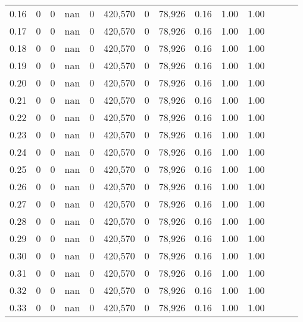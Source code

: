 \begin{tabular}{rrrrrrrrrrrrrr}
0.16 &        0 &       0 &   nan &        0 &  420,570 &       0 &  78,926 &  0.16 &  1.00 &      1.00 \\
0.17 &        0 &       0 &   nan &        0 &  420,570 &       0 &  78,926 &  0.16 &  1.00 &      1.00 \\
0.18 &        0 &       0 &   nan &        0 &  420,570 &       0 &  78,926 &  0.16 &  1.00 &      1.00 \\
0.19 &        0 &       0 &   nan &        0 &  420,570 &       0 &  78,926 &  0.16 &  1.00 &      1.00 \\
0.20 &        0 &       0 &   nan &        0 &  420,570 &       0 &  78,926 &  0.16 &  1.00 &      1.00 \\
0.21 &        0 &       0 &   nan &        0 &  420,570 &       0 &  78,926 &  0.16 &  1.00 &      1.00 \\
0.22 &        0 &       0 &   nan &        0 &  420,570 &       0 &  78,926 &  0.16 &  1.00 &      1.00 \\
0.23 &        0 &       0 &   nan &        0 &  420,570 &       0 &  78,926 &  0.16 &  1.00 &      1.00 \\
0.24 &        0 &       0 &   nan &        0 &  420,570 &       0 &  78,926 &  0.16 &  1.00 &      1.00 \\
0.25 &        0 &       0 &   nan &        0 &  420,570 &       0 &  78,926 &  0.16 &  1.00 &      1.00 \\
0.26 &        0 &       0 &   nan &        0 &  420,570 &       0 &  78,926 &  0.16 &  1.00 &      1.00 \\
0.27 &        0 &       0 &   nan &        0 &  420,570 &       0 &  78,926 &  0.16 &  1.00 &      1.00 \\
0.28 &        0 &       0 &   nan &        0 &  420,570 &       0 &  78,926 &  0.16 &  1.00 &      1.00 \\
0.29 &        0 &       0 &   nan &        0 &  420,570 &       0 &  78,926 &  0.16 &  1.00 &      1.00 \\
0.30 &        0 &       0 &   nan &        0 &  420,570 &       0 &  78,926 &  0.16 &  1.00 &      1.00 \\
0.31 &        0 &       0 &   nan &        0 &  420,570 &       0 &  78,926 &  0.16 &  1.00 &      1.00 \\
0.32 &        0 &       0 &   nan &        0 &  420,570 &       0 &  78,926 &  0.16 &  1.00 &      1.00 \\
0.33 &        0 &       0 &   nan &        0 &  420,570 &       0 &  78,926 &  0.16 &  1.00 &      1.00 \\

\end{tabular}

